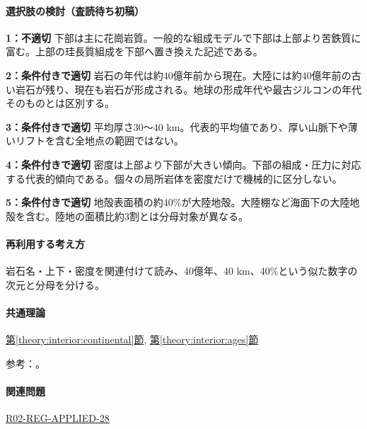 \paragraph{選択肢の検討（査読待ち初稿）}\mbox{}\par

\noindent\textbf{1：不適切} 下部は主に花崗岩質。一般的な組成モデルで下部は上部より苦鉄質に富む。上部の珪長質組成を下部へ置き換えた記述である。\par

\noindent\textbf{2：条件付きで適切} 岩石の年代は約40億年前から現在。大陸には約40億年前の古い岩石が残り、現在も岩石が形成される。地球の形成年代や最古ジルコンの年代そのものとは区別する。\par

\noindent\textbf{3：条件付きで適切} 平均厚さ30〜40 km。代表的平均値であり、厚い山脈下や薄いリフトを含む全地点の範囲ではない。\par

\noindent\textbf{4：条件付きで適切} 密度は上部より下部が大きい傾向。下部の組成・圧力に対応する代表的傾向である。個々の局所岩体を密度だけで機械的に区分しない。\par

\noindent\textbf{5：条件付きで適切} 地殻表面積の約40\%が大陸地殻。大陸棚など海面下の大陸地殻を含む。陸地の面積比約3割とは分母対象が異なる。\par

\paragraph{再利用する考え方} 岩石名・上下・密度を関連付けて読み、40億年、40 km、40\%という似た数字の次元と分母を分ける。

\paragraph{共通理論} \hyperref[theory:interior:continental]{第\ref*{theory:interior:continental}節}, \hyperref[theory:interior:ages]{第\ref*{theory:interior:ages}節}

\par 参考：\cite{umich_crust_teaching,tokyo_crust_gallery}。

\paragraph{関連問題} \hyperref[q:r02-reg-applied-28]{R02-REG-APPLIED-28}

